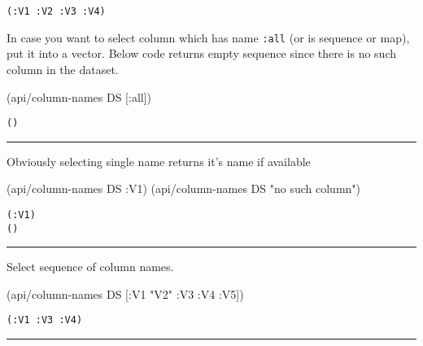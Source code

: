 \documentclass[]{article}
\newenvironment{Shaded}{\begin{snugshade}}{\end{snugshade}}
\newcommand{\AttributeTok}[1]{\textcolor[rgb]{0.77,0.63,0.00}{#1}}
\newcommand{\NormalTok}[1]{#1}
\newcommand{\StringTok}[1]{\textcolor[rgb]{0.31,0.60,0.02}{#1}}
\begin{document}
\begin{verbatim}
(:V1 :V2 :V3 :V4)
\end{verbatim}

In case you want to select column which has name \texttt{:all} (or is
sequence or map), put it into a vector. Below code returns empty
sequence since there is no such column in the dataset.

\begin{Shaded}
\begin{Highlighting}[]
\NormalTok{(api/column-names DS [}\AttributeTok{:all}\NormalTok{])}
\end{Highlighting}
\end{Shaded}

\begin{verbatim}
()
\end{verbatim}

\begin{center}\rule{0.5\linewidth}{0.5pt}\end{center}

Obviously selecting single name returns it's name if available

\begin{Shaded}
\begin{Highlighting}[]
\NormalTok{(api/column-names DS }\AttributeTok{:V1}\NormalTok{)}
\NormalTok{(api/column-names DS }\StringTok{"no such column"}\NormalTok{)}
\end{Highlighting}
\end{Shaded}

\begin{verbatim}
(:V1)
()
\end{verbatim}

\begin{center}\rule{0.5\linewidth}{0.5pt}\end{center}

Select sequence of column names.

\begin{Shaded}
\begin{Highlighting}[]
\NormalTok{(api/column-names DS [}\AttributeTok{:V1} \StringTok{"V2"} \AttributeTok{:V3} \AttributeTok{:V4} \AttributeTok{:V5}\NormalTok{])}
\end{Highlighting}
\end{Shaded}

\begin{verbatim}
(:V1 :V3 :V4)
\end{verbatim}

\begin{center}\rule{0.5\linewidth}{0.5pt}\end{center}
\end{document}
